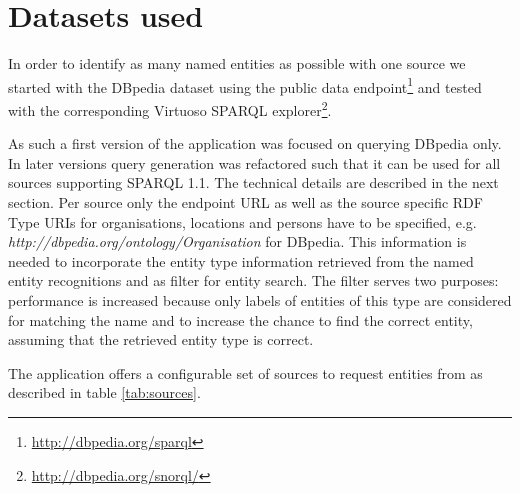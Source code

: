 \section{Datasets used} 
\label{sec:datasets}
In order to identify as many named entities as possible with one source we started with the DBpedia dataset \cite{dbpedia_dbpedia_2016}
using the public data endpoint\footnote{\url{http://dbpedia.org/sparql}} and tested with the corresponding Virtuoso \cite{openlink_software_openlink_2016} SPARQL explorer\footnote{\url{http://dbpedia.org/snorql/}}.

As such a first version of the application was focused on querying DBpedia only. In later versions query generation was refactored such that it can be used for all sources supporting SPARQL 1.1. The technical details are described in the next section. Per source only the endpoint URL as well as the source specific RDF Type URIs for organisations, locations and persons have to be specified, e.g. \textit{http://dbpedia.org/ontology/Organisation} for DBpedia. This information is needed to incorporate the entity type information retrieved from the named entity recognitions and as filter for entity search. The filter serves two purposes: performance is increased because only labels of entities of this type are considered for matching the name and to increase the chance to find the correct entity, assuming that the retrieved entity type is correct. 

The application offers a configurable set of sources to request entities from as described in table \ref{tab:sources}.


